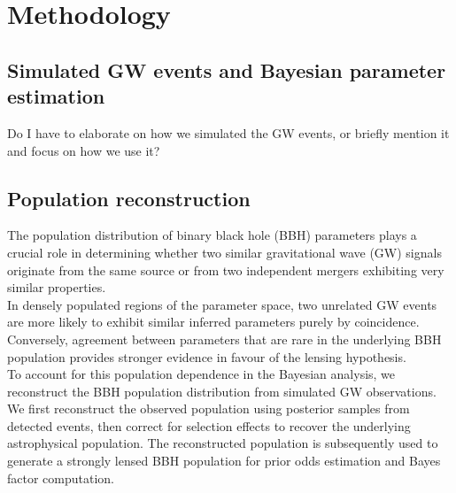 \documentclass[pdflatex,sn-mathphys-num]{sn-jnl}%
\theoremstyle{thmstyleone}%
\theoremstyle{thmstyletwo}%
\theoremstyle{thmstylethree}%
\begin{document}
\section{Methodology}
\subsection{Simulated GW events and Bayesian parameter estimation}
Do I have to elaborate on how we simulated the GW events, or briefly mention it and focus on how we use it?

\subsection{Population reconstruction}
\label{sec:population_reconstruction}
The population distribution of binary black hole (BBH) parameters plays a crucial role in determining 
whether two similar gravitational wave (GW) signals originate from the same source or from two independent 
mergers exhibiting very similar properties.\\
In densely populated regions of the parameter space, two unrelated GW events are more likely to exhibit 
similar inferred parameters purely by coincidence. Conversely, agreement between parameters that are rare 
in the underlying BBH population provides stronger evidence in favour of the lensing hypothesis.\\
To account for this population dependence in the Bayesian analysis, we reconstruct the BBH population 
distribution from simulated GW observations. We first reconstruct the observed population using posterior 
samples from detected events, then correct for selection effects to recover the underlying astrophysical 
population. The reconstructed population is subsequently used to generate a strongly lensed BBH population 
for prior odds estimation and Bayes factor computation.
\end{document}
